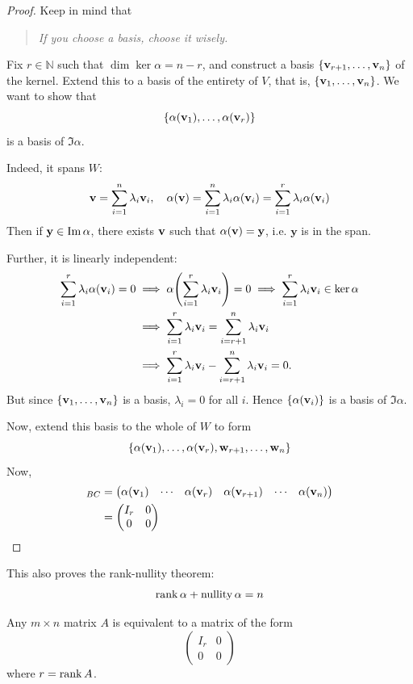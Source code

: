 \documentclass[a4paper]{article}
\begin{document}
\begin{proof}
    Keep in mind that
    \begin{quotation}
        \textit{If you choose a basis, choose it wisely.}
    \end{quotation}
	Fix $ r \in \mathbb N $ such that $ \dim \ker \alpha = n - r $,
	and construct a basis $ \qty{{\bf v}_{r+1}, \dots, {\bf v}_n} $ of the kernel.
	Extend this to a basis of the entirety of $ V $, that is, $ \qty{{\bf v}_1,\dots,{\bf v}_n} $.
    We want to show that
	\[
		\qty{\alpha({\bf v}_1), \dots, \alpha({\bf v}_r)}
	\]
	is a basis of $ \Im \alpha $.

	Indeed, it spans $W$:
	\[
        {\bf v}         = \sum_{i=1}^n \lambda_i {\bf v}_i,         \quad
		\alpha({\bf v}) = \sum_{i=1}^n \lambda_i \alpha({\bf v}_i)
		          = \sum_{i=1}^r \lambda_i \alpha({\bf v}_i)
    \]
	Then if $ {\bf y} \in \Im \alpha $, there exists $ {\bf v} $ such that $ \alpha({\bf v}) = {\bf y} $, i.e. $ \mathbf{y} $ is in the span.

	Further, it is linearly independent:
	\begin{align*}
		\sum_{i=1}^r \lambda_i \alpha({\bf v}_i) = 0&\implies
		\alpha\qty(\sum_{i=1}^r \lambda_i {\bf v}_i)= 0 \implies
		\sum_{i=1}^r \lambda_i {\bf v}_i \in \ker \alpha \\
        &\implies \sum_{i=1}^r \lambda_i {\bf v}_i = \sum_{i=r+1}^n \lambda_i {\bf v}_i \\
		&\implies \sum_{i=1}^r \lambda_i {\bf v}_i - \sum_{i=r+1}^n \lambda_i {\bf v}_i  = 0.
	\end{align*}
	But since $ \qty{{\bf v}_1, \dots, {\bf v}_n} $ is a basis, $ \lambda_i = 0 $ for all $ i $.
	Hence $ \qty{\alpha({\bf v}_i)} $ is a basis of $ \Im \alpha $.

	Now, extend this basis to the whole of $ W $ to form
	\[
		\qty{\alpha({\bf v}_1), \dots, \alpha({\bf v}_r), {\bf w}_{r+1}, \dots, {\bf w}_n}
	\]
	Now,
	\begin{align*}
		[\alpha]_{BC} & = \begin{pmatrix}
			\alpha(\bfv_1) & \cdots & \alpha(\bfv_r) & \alpha(\bfv_{r+1}) & \cdots & \alpha(\bfv_n)
		\end{pmatrix} \\
		              & = \begin{pmatrix}
			I_r & 0 \\
			0   & 0
		\end{pmatrix}\qedhere
	\end{align*}
\end{proof}
\begin{remark}
	This also proves the rank-nullity theorem:
	\[
		\rank \alpha + \operatorname{nullity} \alpha = n
	\]
\end{remark}
\begin{corollary}
	Any $ m \times n $ matrix $ A $ is equivalent to a matrix of the form
	\[
		\begin{pmatrix}
			I_r & 0 \\
			0   & 0
		\end{pmatrix}
	\]
	where $ r = \rank A $.
\end{corollary}
\end{document}
